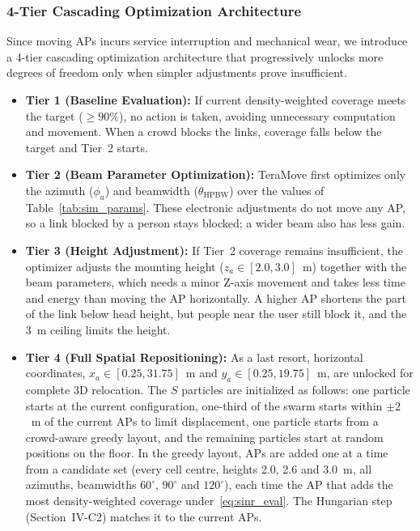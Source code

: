 \documentclass[conference]{IEEEtran}
\begin{document}
	\subsubsection{4-Tier Cascading Optimization Architecture}

	Since moving APs incurs service interruption and mechanical wear, we introduce a 4-tier cascading optimization architecture that progressively unlocks more degrees of freedom only when simpler adjustments prove insufficient.

	\begin{itemize}
		\item \textbf{Tier 1 (Baseline Evaluation):} If current density-weighted
		coverage meets the target ($\ge 90\%$), no action is taken,
		avoiding unnecessary computation and movement. When a crowd blocks the links, coverage falls below the target and Tier~2 starts.

		\item \textbf{Tier 2 (Beam Parameter Optimization):} TeraMove first
		optimizes only the azimuth ($\phi_a$) and beamwidth ($\theta_{\text{HPBW}}$) over the values of Table~\ref{tab:sim_params}. These electronic adjustments do not move any AP, so a link blocked by a person stays blocked; a wider beam also has less gain.

		\item \textbf{Tier 3 (Height Adjustment):} If Tier~2 coverage
		remains insufficient, the optimizer adjusts the mounting height
		($z_a \in [2.0, 3.0]$~m) together with the beam parameters, which needs a minor Z-axis movement and takes less time and energy than moving the AP horizontally. A higher AP shortens the part of the link below head height, but people near the user still block it, and the 3~m ceiling limits the height.

		\item \textbf{Tier 4 (Full Spatial Repositioning):} As a last resort,
		horizontal coordinates, $x_a \in [0.25, 31.75]$~m and $y_a \in [0.25, 19.75]$~m, are unlocked for complete 3D relocation.
		The $S$ particles are initialized as follows: one particle starts at the current configuration, one-third of the swarm starts within $\pm 2$~m of the current APs to limit displacement, one particle starts from a crowd-aware greedy layout, and the remaining particles start at random positions on the floor. In the greedy layout, APs are added one at a time from a candidate set (every cell centre, heights 2.0, 2.6 and 3.0~m, all azimuths, beamwidths $60^{\circ}$, $90^{\circ}$ and $120^{\circ}$), each time the AP that adds the most density-weighted coverage under~\eqref{eq:sinr_eval}. The Hungarian step (Section~IV-C2) matches it to the current APs.
	\end{itemize}
\end{document}
